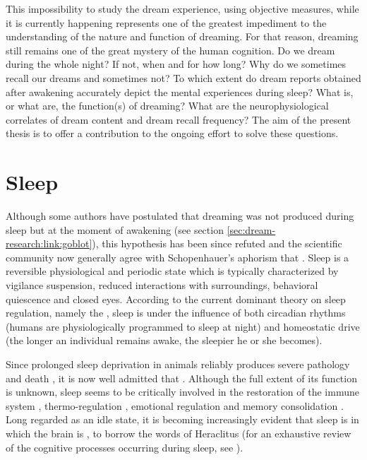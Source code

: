This impossibility to study the dream experience, using objective measures, while it is currently happening represents one of the greatest impediment to the understanding of the nature and function of dreaming. For that reason, dreaming still remains one of the great mystery of the human cognition. Do we dream during the whole night? If not, when and for how long? Why do we sometimes recall our dreams and sometimes not? To which extent do dream reports obtained after awakening accurately depict the mental experiences during sleep? What is, or what are, the function(s) of dreaming? What are the neurophysiological correlates of dream content and dream recall frequency? The aim of the present thesis is to offer a contribution to the ongoing effort to solve these questions.

\section{Sleep}
\label{sec:dream-research:sleep}

Although some authors have postulated that dreaming was not produced during sleep but at the moment of awakening (see section \ref{sec:dream-research:link:goblot}), this hypothesis has been since refuted and the scientific community now generally agree with Schopenhauer's aphorism that . Sleep is a reversible physiological and periodic state which is typically characterized by vigilance suspension, reduced interactions with surroundings, behavioral quiescence and closed eyes. According to the current dominant theory on sleep regulation, namely the  \citep{borbely_two_1982}, sleep is under the influence of both circadian rhythms (humans are physiologically programmed to sleep at night) and homeostatic drive (the longer an individual remains awake, the sleepier he or she becomes).

Since prolonged sleep deprivation in animals reliably produces severe pathology and death \citep{rechtschaffen_physiological_1983, rechtschaffen_sleep_1989}, it is now well admitted that  \citep{tononi_sleep_2014}. Although the full extent of its function is unknown, sleep seems to be critically involved in the restoration of the immune system \citep{bryant_sick_2004}, thermo-regulation \citep{krueger_thermoregulation_1997}, emotional regulation \citep{goldstein_role_2014} and memory consolidation \citep{diekelmann_memory_2010}. Long regarded as an idle state, it is becoming increasingly evident that sleep is  \citep{hirshkowitz_normal_2004} in which the brain is , to borrow the words of Heraclitus (for an exhaustive review of the cognitive processes occurring during sleep, see \citealp{andrillon_sleeping_2016}).

